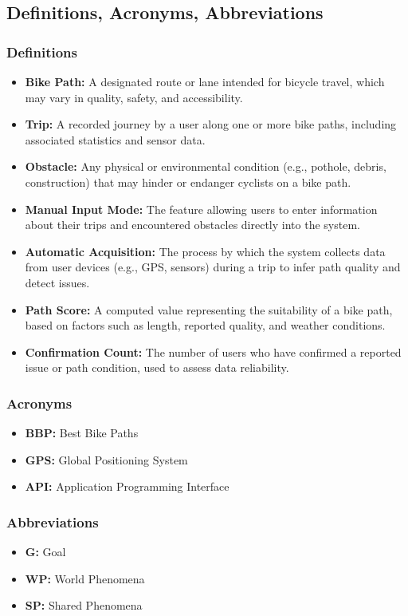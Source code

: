 \subsection{Definitions, Acronyms, Abbreviations}
\subsubsection{Definitions}
\begin{itemize}
	\item \textbf{Bike Path:} A designated route or lane intended for bicycle travel, which may vary in quality, safety, and accessibility.
	\item \textbf{Trip:} A recorded journey by a user along one or more bike paths, including associated statistics and sensor data.
	\item \textbf{Obstacle:} Any physical or environmental condition (e.g., pothole, debris, construction) that may hinder or endanger cyclists on a bike path.
	\item \textbf{Manual Input Mode:} The feature allowing users to enter information about their trips and encountered obstacles directly into the system.
	\item \textbf{Automatic Acquisition:} The process by which the system collects data from user devices (e.g., GPS, sensors) during a trip to infer path quality and detect issues.
	\item \textbf{Path Score:} A computed value representing the suitability of a bike path, based on factors such as length, reported quality, and weather conditions.
	\item \textbf{Confirmation Count:} The number of users who have confirmed a reported issue or path condition, used to assess data reliability.
\end{itemize}
\subsubsection{Acronyms}
\begin{itemize}
	\item \textbf{BBP:} Best Bike Paths
	\item \textbf{GPS:} Global Positioning System
	\item \textbf{API:} Application Programming Interface
\end{itemize}
\subsubsection{Abbreviations}
\begin{itemize}
	\item \textbf{G:} Goal
	\item \textbf{WP:} World Phenomena
	\item \textbf{SP:} Shared Phenomena
\end{itemize}

